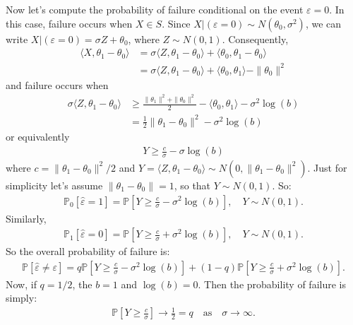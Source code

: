 \documentclass{article}
\theoremstyle{thm}
\theoremstyle{definition}
\newcommand{\ep}{\varepsilon}
\newcommand{\1}{\mathbf{1}}
\renewcommand{\P}{\mathbb{P}}
\begin{document}
Now let's compute the probability of failure conditional on the event $\ep = 0$. In this case, failure occurs when $X \in S$. Since $X|(\ep=0) \sim N(\theta_0,\sigma^2)$, we can write $X | (\ep=0) = \sigma Z + \theta_0$, where $Z \sim N(0,1)$. Consequently,
%
\begin{align}
%
\langle X , \theta_1 - \theta_0 \rangle 
&= \sigma \langle Z , \theta_1 - \theta_0 \rangle 
    + \langle \theta_0,\theta_1 - \theta_0 \rangle
    \nonumber \\
&= \sigma \langle Z , \theta_1 - \theta_0 \rangle 
            + \langle \theta_0,\theta_1 \rangle - \|\theta_0\|^2
%
\end{align}
%
and failure occurs when 
%
\begin{align}
%
\sigma\langle Z, \theta_1 - \theta_0 \rangle 
&\ge \frac{\|\theta_1\|^2 + \|\theta_0\|^2}{2} - \langle \theta_0,\theta_1 \rangle
    - \sigma^2 \log(b)
    \nonumber \\
&= \frac{1}{2} \|\theta_1 - \theta_0\|^2 - \sigma^2 \log(b)
%
\end{align}
%
or equivalently
%
\begin{align}
%
Y \ge \frac{c}{\sigma} - \sigma \log(b)
%
\end{align}
%
where $c = \|\theta_1 - \theta_0\|^2 / 2$ and $Y = \langle Z , \theta_1 - \theta_0 \rangle \sim N(0,\|\theta_1 - \theta_0\|^2)$. Just for simplicity let's assume $\| \theta_1 - \theta_0\| = 1$, so that $Y \sim N(0,1)$. So:
%
\begin{align}
%
\P_0[\hat{\ep} = 1] = \P\left[Y \ge \frac{c}{\sigma} - \sigma^2 \log(b) \right],
    \quad Y \sim N(0,1).
%
\end{align}
%
Similarly,
%
\begin{align}
%
\P_1[\hat{\ep} = 0] = \P\left[Y \ge \frac{c}{\sigma} + \sigma^2 \log(b) \right],
    \quad Y \sim N(0,1).
%
\end{align}
%
So the overall probability of failure is:
%
\begin{align}
%
\P[\hat{\ep} \ne \ep]
= q \P\left[Y \ge \frac{c}{\sigma} - \sigma^2 \log(b) \right]
    + (1-q) \P\left[Y \ge \frac{c}{\sigma} + \sigma^2 \log(b) \right].
%
\end{align}
%
Now, if $q = 1/2$, the $b = 1$ and $\log(b) = 0$. Then the probability of failure is simply:
%
\begin{align}
%
\P\left[Y \ge \frac{c}{\sigma} \right] \longrightarrow \frac{1}{2} = q
    \quad \text{as} \quad \sigma \to \infty.
%
\end{align}
\end{document}
